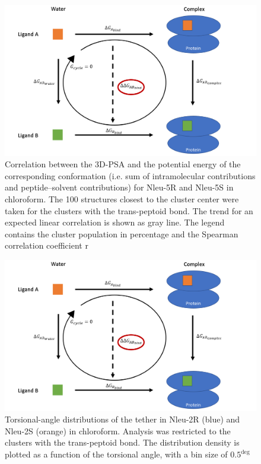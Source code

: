 \begin{figure}
    \centering
    \includegraphics[width=\textwidth]{fig/dummy.png}
    \caption{Correlation between the 3D-PSA and the potential energy of the corresponding conformation (i.e. sum of intramolecular contributions and peptide–solvent 
        contributions) for Nleu-5R and Nleu-5S in chloroform. The 100 structures closest to the cluster  center  were  taken  for  the  clusters  with  the  trans-peptoid  bond.  The  trend  for  an expected  linear  correlation  is  shown  as  gray  line.  The  legend  contains  the  cluster population in percentage and the Spearman correlation coefficient r}
    \label{fig: SI3DPSAANA}
\end{figure}

\begin{figure}
    \centering
    \includegraphics[width=\textwidth]{fig/dummy.png}
    \caption{Torsional-angle distributions of the tether in Nleu-2R (blue) and             Nleu-2S  (orange)  in  chloroform.  Analysis  was  restricted  to  the         clusters  with  the  trans-peptoid bond. The distribution density is           plotted as a function of the torsional angle, with a bin size of               $0.5^{\deg}$}
    \label{fig: SITorsion2RS}
\end{figure}